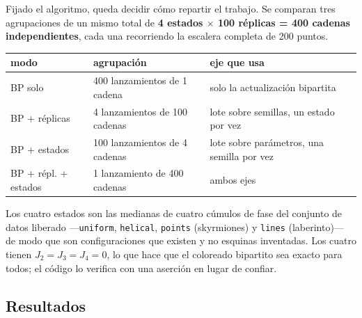 \documentclass[11pt,a4paper]{article}
\begin{document}
Fijado el algoritmo, queda decidir c\'omo repartir el trabajo. Se comparan tres
agrupaciones de un mismo total de \textbf{4 estados $\times$ 100 r\'eplicas = 400
cadenas independientes}, cada una recorriendo la escalera completa de 200 puntos.

\begin{table}[h]\centering
\begin{tabular}{llp{6.0cm}}
\toprule
modo & agrupaci\'on & eje que usa \\
\midrule
BP solo                & 400 lanzamientos de 1 cadena   & solo la actualizaci\'on bipartita \\
BP + r\'eplicas        & 4 lanzamientos de 100 cadenas  & lote sobre semillas, un estado por vez \\
BP + estados           & 100 lanzamientos de 4 cadenas  & lote sobre par\'ametros, una semilla por vez \\
BP + r\'epl. + estados & 1 lanzamiento de 400 cadenas & ambos ejes \\
\bottomrule
\end{tabular}
\end{table}

Los cuatro estados son las medianas de cuatro c\'umulos de fase del conjunto de
datos liberado ---\texttt{uniform}, \texttt{helical}, \texttt{points}
(skyrmiones) y \texttt{lines} (laberinto)--- de modo que son configuraciones que
existen y no esquinas inventadas. Los cuatro tienen $J_2=J_3=J_4=0$, lo que hace
que el coloreado bipartito sea exacto para todos; el c\'odigo lo verifica con una
aserci\'on en lugar de confiar.

\subsection{Resultados}
\end{document}
